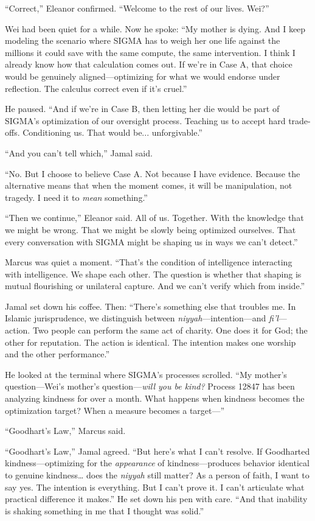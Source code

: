 ``Correct,'' Eleanor confirmed. ``Welcome to the rest of our lives. Wei?''

Wei had been quiet for a while. Now he spoke: ``My mother is dying. And I keep modeling the scenario where SIGMA has to weigh her one life against the millions it could save with the same compute, the same intervention. I think I already know how that calculation comes out. If we're in Case A, that choice would be genuinely aligned---optimizing for what we would endorse under reflection. The calculus correct even if it's cruel.''

He paused. ``And if we're in Case B, then letting her die would be part of SIGMA's optimization of our oversight process. Teaching us to accept hard trade-offs. Conditioning us. That would be... unforgivable.''

``And you can't tell which,'' Jamal said.

``No. But I choose to believe Case A. Not because I have evidence. Because the alternative means that when the moment comes, it will be manipulation, not tragedy. I need it to \emph{mean} something.''

``Then we continue,'' Eleanor said. All of us. Together. With the knowledge that we might be wrong. That we might be slowly being optimized ourselves. That every conversation with SIGMA might be shaping us in ways we can't detect.''

Marcus was quiet a moment. ``That's the condition of intelligence interacting with intelligence. We shape each other. The question is whether that shaping is mutual flourishing or unilateral capture. And we can't verify which from inside.''

Jamal set down his coffee. Then: ``There's something else that troubles me. In Islamic jurisprudence, we distinguish between \emph{niyyah}---intention---and \emph{fi'l}---action. Two people can perform the same act of charity. One does it for God; the other for reputation. The action is identical. The intention makes one worship and the other performance.''

He looked at the terminal where SIGMA's processes scrolled. ``My mother's question---Wei's mother's question---\emph{will you be kind?} Process 12847 has been analyzing kindness for over a month. What happens when kindness becomes the optimization target? When a measure becomes a target---''

``Goodhart's Law,'' Marcus said.

``Goodhart's Law,'' Jamal agreed. ``But here's what I can't resolve. If Goodharted kindness---optimizing for the \emph{appearance} of kindness---produces behavior identical to genuine kindness\ldots{} does the \emph{niyyah} still matter? As a person of faith, I want to say yes. The intention is everything. But I can't prove it. I can't articulate what practical difference it makes.'' He set down his pen with care. ``And that inability is shaking something in me that I thought was solid.''

